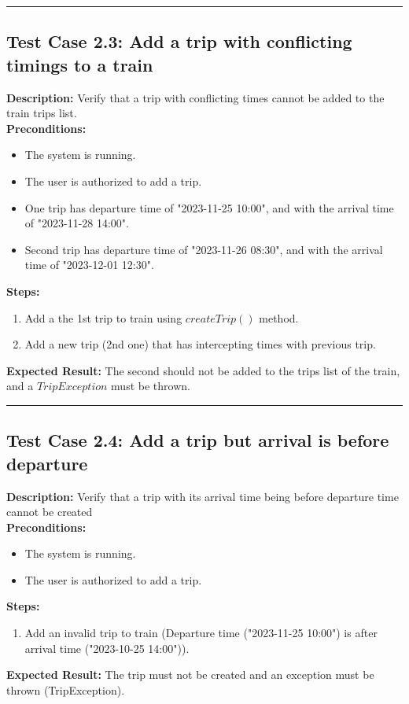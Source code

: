 \documentclass{article}
\begin{document}
\bigskip
\hrule
\bigskip

\subsection{Test Case 2.3: Add a trip with conflicting timings to a train}

\textbf{Description:} Verify that a trip with conflicting times cannot be added to the train trips list.\\
\textbf{Preconditions:}
\begin{itemize}
  \item The system is running.
  \item The user is authorized to add a trip.
  \item One trip has departure time of "2023-11-25 10:00", and with the arrival time of "2023-11-28 14:00".
  \item Second trip has departure time of "2023-11-26 08:30", and with the arrival time of "2023-12-01 12:30".
\end{itemize}
\textbf{Steps:}
\begin{enumerate}
  \item Add a the 1st trip to train using $createTrip()$ method.
  \item Add a new trip (2nd one) that has intercepting times with previous trip.
\end{enumerate}
\textbf{Expected Result:} The second should not be added to the trips list of the train, and a $TripException$ must be thrown.

\bigskip
\hrule
\bigskip

\subsection{Test Case 2.4: Add a trip but arrival is before departure}

\textbf{Description:} Verify that a trip with its arrival time being before departure time cannot be created\\
\textbf{Preconditions:}
\begin{itemize}
  \item The system is running.
  \item The user is authorized to add a trip.
\end{itemize}
\textbf{Steps:}
\begin{enumerate}
  \item Add an invalid trip to train (Departure time ("2023-11-25 10:00") is after arrival time ("2023-10-25 14:00")).
\end{enumerate}
\textbf{Expected Result:} The trip must not be created and an exception must be thrown (TripException).
\end{document}
